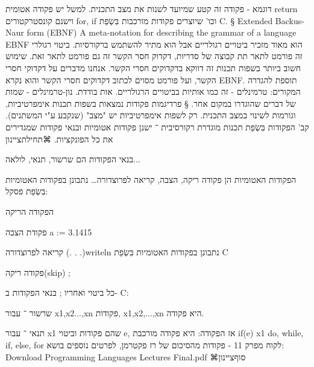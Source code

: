         דוגמא - פקודה זה קטע שמיועד לשנות את מצב התכנית.
        למשל יש פקודה אטומית return וישנם קונסטרקטורים for, if וכו' שיוצרים פקודות מורכבות בִּשְׂפַת C.
§ Extended Backus-Naur form (EBNF)
        A meta-notation for describing the grammar of a language
        EBNF הוא מאוד מזכיר ביטויים רגולריים אבל הוא מתיר להשתמש ברקורסיות.
        ביטוי רגולרי זה פורמט לתאר תת קבוצה של סדריות, דקדוק חסר הקשר זה גם פורמט לתאר זאת. שימוש חשוב ביותר בשפות תכנות זה דווקא בדקדוקים חסרי הקשר.
        אנחנו מדברים על דקדוקי חסרי הקשר, ועל פורמט מסוים לכתוב דקדוקים חסרי הקשר והוא נקרא EBNF. תוספת להגדרה המקורים:
        טרמינלים - זה כמו אותיות בביטויים הרגולריים. אות בודדת.
        נון-טרמינלים - שמות של דברים שהוגדרו במקום אחר.
§ פרדיגמות
        פקודות נמצאות בשפות תכנות אימפרטיביות, וגורמות לשינוי במצב התכנית.
        רק לשפות אימפרטיביות יש "מצב" (שנקבע ע"י המשתנים).
        קב' הפקודות בִּשְׂפַת תכנות מוגדרת רקורסיבית ־
        ישנן פקודות אטומיות ובנאי פקודות שמגדירים את כל הפונקציות.
        ⌘תחילת{ציינון}
          \item בנאי הפקודות הם שרשור, תנאי, לולאה...
          \item הפקודות האטומיות הן פקודה ריקה, הצבה, קריאה לפרוצדורה…
          נתבונן בפקודות האטומיות בִּשְׂפַת פסקל:
          \item הפקודה הריקה
          \item פקודת הצבה a := 3.1415
          \item קריאה לפרוצדורה (. . .)writeln
          נתבונן בפקודות האטומיות בִּשְׂפַת C
          \item פקודה ריקה(skip) ;
          \item כל ביטוי ואחריו ;
          בנאי הפקודות ב- C:
          \item שרשור ־ עבור x1,x2...,xn פקודות, {x1,x2,...,xn} היא פקודה.
          \item תנאי ־ עבור x1 שהם פקודות וביטוי e, אז הפקודה:
          היא פקודה מורכבת if(e){ x1}
          do, while, if, else, for
          לקוח מפרק 11 - פקודות מהסיכום של רז פקטרמן, לפרטים נוספים בושא:
          Download Programming Languages Lectures Final.pdf
        ⌘סוף{ציינון}

